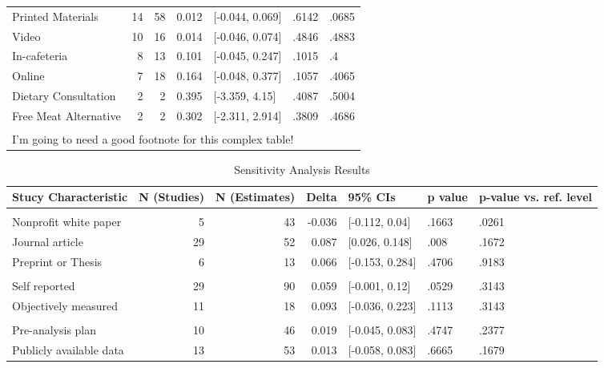 \documentclass[sn-nature,referee,pdflatex]{sn-jnl}
\begin{document}
\begin{table}
\begin{tabular}[t]{lrrrlll}
\hspace{1em}Printed Materials & 14 & 58 & 0.012 & {}[-0.044, 0.069] & .6142 & .0685\\
\hspace{1em}Video & 10 & 16 & 0.014 & {}[-0.046, 0.074] & .4846 & .4883\\
\hspace{1em}In-cafeteria & 8 & 13 & 0.101 & {}[-0.045, 0.247] & .1015 & .4\\
\hspace{1em}Online & 7 & 18 & 0.164 & {}[-0.048, 0.377] & .1057 & .4065\\
\hspace{1em}Dietary Consultation & 2 & 2 & 0.395 & {}[-3.359, 4.15] & .4087 & .5004\\
\hspace{1em}Free Meat Alternative & 2 & 2 & 0.302 & {}[-2.311, 2.914] & .3809 & .4686\\
\bottomrule
\multicolumn{7}{l}{\textsuperscript{} I'm going to need a good footnote for this complex table!}\\
\end{tabular}
\end{table}

\begin{table}

\caption{\label{tab:table_three}Sensitivity Analysis Results}
\centering
\begin{tabular}[t]{lrrrlll}
\toprule
Stucy Characteristic & N (Studies) & N (Estimates) & Delta & 95\% CIs & p value & p-value vs. ref. level\\
\midrule
\addlinespace[0.5em]
\multicolumn{7}{l}{\textbf{Publication Status}}\\
\hspace{1em}Nonprofit white paper & 5 & 43 & -0.036 & {}[-0.112, 0.04] & .1663 & .0261\\
\hspace{1em}Journal article & 29 & 52 & 0.087 & {}[0.026, 0.148] & .008 & .1672\\
\hspace{1em}Preprint or Thesis & 6 & 13 & 0.066 & {}[-0.153, 0.284] & .4706 & .9183\\
\addlinespace[0.5em]
\multicolumn{7}{l}{\textbf{Data collection strategy}}\\
\hspace{1em}Self reported & 29 & 90 & 0.059 & {}[-0.001, 0.12] & .0529 & .3143\\
\hspace{1em}Objectively measured & 11 & 18 & 0.093 & {}[-0.036, 0.223] & .1113 & .3143\\
\addlinespace[0.5em]
\multicolumn{7}{l}{\textbf{Open science practices}}\\
\hspace{1em}Pre-analysis plan & 10 & 46 & 0.019 & {}[-0.045, 0.083] & .4747 & .2377\\
\hspace{1em}Publicly available data & 13 & 53 & 0.013 & {}[-0.058, 0.083] & .6665 & .1679\\
\bottomrule
\end{tabular}
\end{table}
\end{document}
